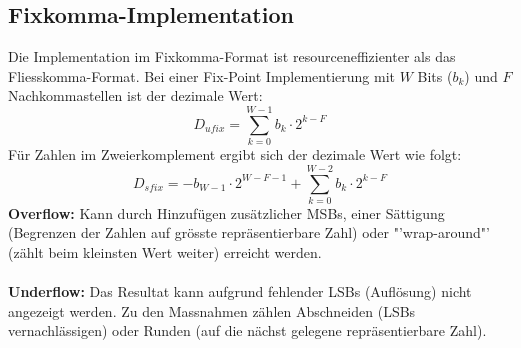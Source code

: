 \subsection{Fixkomma-Implementation}
Die Implementation im Fixkomma-Format ist resourceneffizienter als das Fliesskomma-Format.
Bei einer Fix-Point Implementierung mit $W$ Bits ($b_k$) und $F$ Nachkommastellen ist
der dezimale Wert:
\[ D_{ufix} = \sum_{k=0}^{W-1}b_k \cdot 2^{k-F} \]
Für Zahlen im Zweierkomplement ergibt sich der dezimale Wert wie folgt:
\[ D_{sfix} = -b_{W-1} \cdot 2^{W-F-1} + \sum_{k=0}^{W-2} b_k \cdot 2^{k-F} \]
\textbf{Overflow:}
Kann durch Hinzufügen zusätzlicher MSBs, einer Sättigung (Begrenzen der Zahlen auf grösste 
repräsentierbare Zahl) oder "'wrap-around"' (zählt beim kleinsten Wert weiter) erreicht werden.\\\\ 
\textbf{Underflow:}
Das Resultat kann aufgrund fehlender LSBs (Auflösung) nicht angezeigt werden. Zu den 
Massnahmen zählen Abschneiden (LSBs vernachlässigen) oder Runden (auf die nächst gelegene repräsentierbare Zahl).